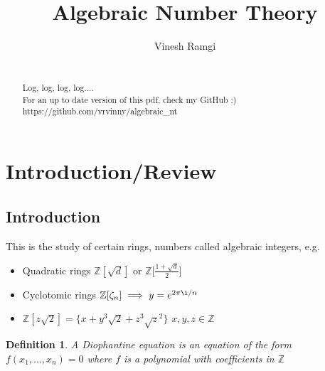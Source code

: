 \documentclass[11pt]{article}
\begin{document}
\newtheorem{theorem}{Theorem}[section]
\newtheorem{defn}[theorem]{Definition}
\newtheorem{prop}[theorem]{Proposition}
\newtheorem{cor}[theorem]{Corollary}
\newtheorem{lemma}[theorem]{Lemma}
\newcommand{\R}{\mathbb{R}}
\newcommand{\Z}{\mathbb{Z}}
\newcommand{\C}{\mathbb{C}}
\newcommand{\Q}{\mathbb{Q}}
\newcommand{\A}{\alpha}

\title{Algebraic Number Theory}
\author{Vinesh Ramgi}
	\maketitle


\newpage
	\begin{abstract}

		\\[1em]
		Log, log, log, log....\\[2em]

		For an up to date version of this pdf, check my GitHub :)\\[0.5em]
https://github.com/vrvinny/algebraic\_nt

	\end{abstract}
\newpage
\tableofcontents{}
\newpage
	\section{Introduction/Review}
	\subsection{Introduction}
		This is the study of certain rings, numbers called algebraic integers, e.g. 
	
	\begin{itemize}
		\item{Quadratic rings $\Z[\sqrt{d}]$ or $\Z [\frac{1+\sqrt{d}}{2}$]}
		\item{Cyclotomic rings $\Z[\zeta_n] \implies y = e^{2\pi \i /n }$}
		\item{$\Z[z\sqrt{2}] = \{ x+y^3\sqrt{2} + z^3 \sqrt{z}^2 \}$ $x,y,z \in \Z$}
	\end{itemize}


	\begin{defn}
		A Diophantine equation is an equation of the form $f(x_1, \dots, x_n)=0 $ where $f$ is a polynomial with coefficients in $\Z$ 
	\end{defn}
\end{document}

